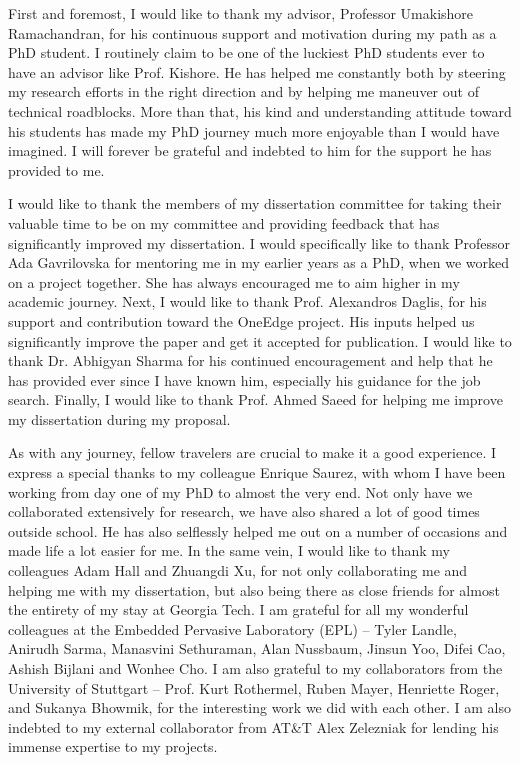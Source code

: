 \begin{acknowledgments}
First and foremost, I would like to thank my advisor, Professor Umakishore Ramachandran, for his continuous support and motivation during my path as a PhD student. I routinely claim to be one of the luckiest PhD students ever to have an advisor like Prof. Kishore. He has helped me constantly both by steering my research efforts in the right direction and by helping me maneuver out of technical roadblocks. More than that, his kind and understanding attitude toward his students has made my PhD journey much more enjoyable than I would have imagined. I will forever be grateful and indebted to him for the support he has provided to me.
\par I would like to thank the members of my dissertation committee for taking their valuable time to be on my committee and providing feedback that has significantly improved my dissertation. I would specifically like to thank Professor Ada Gavrilovska for mentoring me in my earlier years as a PhD, when we worked on a project together. She has always encouraged me to aim higher in my academic journey. Next, I would like to thank Prof. Alexandros Daglis, for his support and contribution toward the OneEdge project. His inputs helped us significantly improve the paper and get it accepted for publication. I would like to thank Dr. Abhigyan Sharma for his continued encouragement and help that he has provided ever since I have known him, especially his guidance for the job search. Finally, I would like to thank Prof. Ahmed Saeed for helping me improve my dissertation during my proposal.
\par As with any journey, fellow travelers are crucial to make it a good experience. I express a special thanks to my colleague Enrique Saurez, with whom I have been working from day one of my PhD to almost the very end. Not only have we collaborated extensively for research, we have also shared a lot of good times outside school. He has also selflessly helped me out on a number of occasions and made life a lot easier for me. In the same vein, I would like to thank my colleagues Adam Hall and Zhuangdi Xu, for not only collaborating me and helping me with my dissertation, but also being there as close friends for almost the entirety of my stay at Georgia Tech. I am grateful for all my wonderful colleagues at the Embedded Pervasive Laboratory (EPL) -- Tyler Landle, Anirudh Sarma, Manasvini Sethuraman, Alan Nussbaum, Jinsun Yoo, Difei Cao, Ashish Bijlani and Wonhee Cho. I am also grateful to my collaborators from the University of Stuttgart -- Prof. Kurt Rothermel, Ruben Mayer, Henriette Roger, and Sukanya Bhowmik, for the interesting work we did with each other. I am also indebted to my external collaborator from AT\&T Alex Zelezniak for lending his immense expertise to my projects.

\end{acknowledgments}
